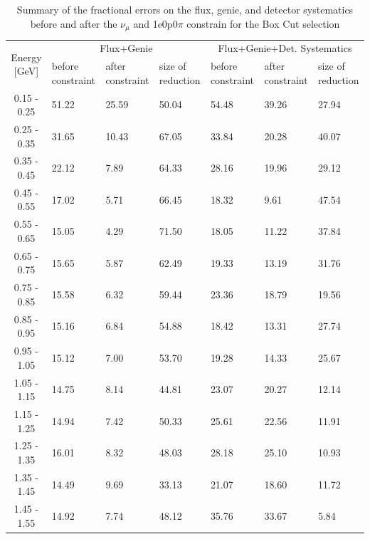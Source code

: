 \documentclass[a4paper]{article}
\begin{document}
\begin{table}[H]
\centering
 \begin{tabular}{| c | m{1.65cm} | m{1.65cm} | m{1.65cm} | m{1.65cm} | m{1.65cm} | m{1.65cm}|} 
\cline{1-7}
\multirow{2}{*}{Energy [GeV]} &\multicolumn{3}{c|}{Flux+Genie}&\multicolumn{3}{c|}{Flux+Genie+Det. Systematics}\\
\cline{2-7}
{} &  before constraint & after constraint  & size of reduction & before constraint & after constraint & size of reduction \\
\hline
0.15 - 0.25&51.22&25.59&50.04&54.48&39.26&27.94\\
0.25 - 0.35&31.65&10.43&67.05&33.84&20.28&40.07\\
0.35 - 0.45&22.12&7.89&64.33&28.16&19.96&29.12\\
0.45 - 0.55&17.02&5.71&66.45&18.32&9.61&47.54\\
0.55 - 0.65&15.05&4.29&71.50&18.05&11.22&37.84\\
0.65 - 0.75&15.65&5.87&62.49&19.33&13.19&31.76\\
0.75 - 0.85&15.58&6.32&59.44&23.36&18.79&19.56\\
0.85 - 0.95&15.16&6.84&54.88&18.42&13.31&27.74\\
0.95 - 1.05&15.12&7.00&53.70&19.28&14.33&25.67\\
1.05 - 1.15&14.75&8.14&44.81&23.07&20.27&12.14\\
1.15 - 1.25&14.94&7.42&50.33&25.61&22.56&11.91\\
1.25 - 1.35&16.01&8.32&48.03&28.18&25.10&10.93\\
1.35 - 1.45&14.49&9.69&33.13&21.07&18.60&11.72\\
1.45 - 1.55&14.92&7.74&48.12&35.76&33.67&5.84\\
\hline
\end{tabular}
\caption{Summary of the fractional errors on the flux, genie, and detector systematics before and after the $\nu_\mu$ and 1e0p$0\pi$ constrain for the Box Cut selection}
\label{tab:numu_1e0p_boxcut_const   }
\end{table}
\end{document}
